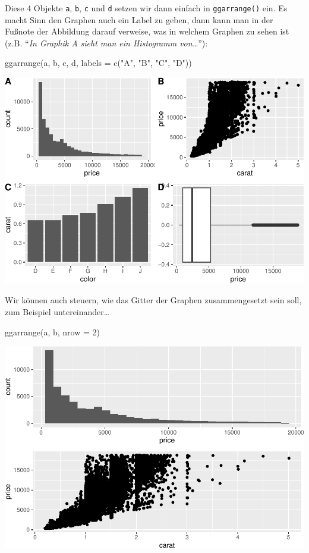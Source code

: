 \documentclass[
]{book}
\newenvironment{Shaded}{\begin{snugshade}}{\end{snugshade}}
\newcommand{\AttributeTok}[1]{\textcolor[rgb]{0.77,0.63,0.00}{#1}}
\newcommand{\DecValTok}[1]{\textcolor[rgb]{0.00,0.00,0.81}{#1}}
\newcommand{\FunctionTok}[1]{\textcolor[rgb]{0.00,0.00,0.00}{#1}}
\newcommand{\NormalTok}[1]{#1}
\newcommand{\StringTok}[1]{\textcolor[rgb]{0.31,0.60,0.02}{#1}}
\begin{document}
Diese 4 Objekte \texttt{a}, \texttt{b}, \texttt{c} und \texttt{d} setzen wir dann einfach in \texttt{ggarrange()} ein. Es macht Sinn den Graphen auch ein Label zu geben, dann kann man in der Fußnote der Abbildung darauf verweise, was in welchem Graphen zu sehen ist (z.B. ``\emph{In Graphik A sieht man ein Histogramm von\ldots{}}''):

\begin{Shaded}
\begin{Highlighting}[]
\FunctionTok{ggarrange}\NormalTok{(a, b, c, d, }\AttributeTok{labels =} \FunctionTok{c}\NormalTok{(}\StringTok{"A"}\NormalTok{, }\StringTok{"B"}\NormalTok{, }\StringTok{"C"}\NormalTok{, }\StringTok{"D"}\NormalTok{))}
\end{Highlighting}
\end{Shaded}

\includegraphics{CFH_R_bookdown_files/figure-latex/unnamed-chunk-186-1.pdf}

Wir können auch steuern, wie das Gitter der Graphen zusammengesetzt sein soll, zum Beispiel untereinander\ldots{}

\begin{Shaded}
\begin{Highlighting}[]
\FunctionTok{ggarrange}\NormalTok{(a, b, }\AttributeTok{nrow =} \DecValTok{2}\NormalTok{)}
\end{Highlighting}
\end{Shaded}

\includegraphics{CFH_R_bookdown_files/figure-latex/unnamed-chunk-187-1.pdf}
\end{document}
